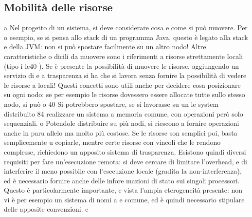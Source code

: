 \subsection{Mobilità delle risorse}
a
Nel progetto di un sistema, si deve considerare cosa e come si può muovere. Per
o
esempio, se si pensa allo stack di un programma Java, questo è legato alla stack
e
della JVM: non si può spostare facilmente su un altro nodo! Altre caratteristiche
o
dicili da muovere sono i riferimenti a risorse strettamente locali (tipo i le40 ).
Se è presente la possibilità di muovere le risorse, aggiungendo un servizio di
e
a
trasparenza si ha che si lavora senza fornire la possibilità di vedere le risorse
a
locali!
Questi concetti sono utili anche per decidere cosa posizionare su ogni nodo:
se per esempio le risorse dovessero essere allocate tutte sullo stesso nodo, si può
o
40 Si
potrebbero spostare, se si lavorasse su un le system distribuito
84
realizzare un sistema a memoria comune, con operazioni però solo sequenziali.
o
Potendole distribuire su più nodi, si riescono a fornire operazioni anche in paru
allelo ma molto più costose. Se le risorse son semplici poi, basta semplicemente
u
copiarle, mentre certe risorse con vincoli che le rendono complesse, richiedono
un apposito sistema di trasparenza.
Esistono quindi diversi requisiti per fare un'esecuzione remota: si deve cercare di limitare l'overhead, e di
interferire il meno possibile con l'esecuzione
locale (gradita la non-interferenza), ed è necessario fornire anche delle infore
mazioni di stato sui singoli processori. Questo è particolarmente importante,
e
vista l'ampia eterogeneità presente: non vi è per esempio un sistema di nomi
a
e
comune, ed è quindi necessario stipulare delle apposite convenzioni.
e
